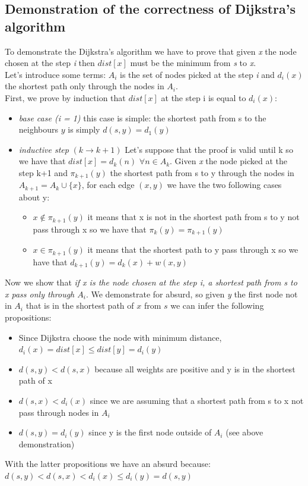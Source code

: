 \documentclass[10pt,a4paper]{book}
\begin{document}
		\subsection{Demonstration of the correctness of  Dijkstra's algorithm}
		To demonstrate the Dijkstra's algorithm we have to prove that given \textit{x} the node chosen at the step \textit{i} then $ dist[x] $ must be the minimum from \textit{s} to \textit{x}.\\
			Let's introduce some terms: $ A_i $ is the set of nodes picked at the step \textit{i} and $ d_i(x) $ the shortest path only through the nodes in $ A_i $.\\
			First, we prove by induction that $ dist[x] $ at the step i is equal to $ d_i(x) $:
			\begin{itemize}
				\item \textit{base case (i = 1)}  this case is simple: the shortest path from s to the neighbours $ y $ is simply $ d(s, y) = d_1(y) $
				\item \textit{inductive step} $ (k \rightarrow k+1) $ Let's suppose that the proof is valid until k so we have that $ dist[x] = d_k(n) \,\, \forall n \in A_k $. Given \textit{x} the node picked at the step k+1 and $ \pi_{k+1}(y) $ the shortest path from s to y through the nodes in $ A_{k+1} = A_k  \cup \{x\}$, for each edge $ (x, y) $ we have the two following cases about y:
				\begin{itemize}
					\item $ x \notin\pi_{k+1}(y)  $ it means that x is not in the shortest path from s to y not pass through x so we have that $ \pi_{k}(y)  = \pi_{k+1}(y)  $
					\item $ x \in\pi_{k+1}(y)  $  it means that the shortest path to y pass through x so we have that $ d_{k+1}(y) = d_k(x) + w(x,y) $
				\end{itemize}
			\end{itemize}
		Now we show that \textit{if x is the node chosen at the step i, a shortest path from s to x pass only through $ A_i $}.
		We demonstrate for absurd, so given \textit{y} the first node not in $ A_i $ that is in the shortest path of $ x  $ from $ s $ we can infer the following propositions:
		\begin{itemize}
			\item Since Dijkstra choose the node with minimum distance, $ d_i(x) =  dist[x]  \leq dist[y] = d_i(y) $
			\item $ d(s,y) < d(s,x) $ because all weights are positive and y is in the shortest path of x
			\item $ d(s,x) < d_i(x) $ since we are assuming that a shortest path from s to x not pass through nodes in $ A_i $
		 	\item  $ d(s,y) = d_i(y) $	since y is the first node outside of $ A_i $ (see above demonstration)
	\end{itemize}
	With the latter propositions we have an absurd because:\\ $ d(s,y) < d(s,x) < d_i(x) \leq d_i(y) = d(s,y) $\\
\end{document}
